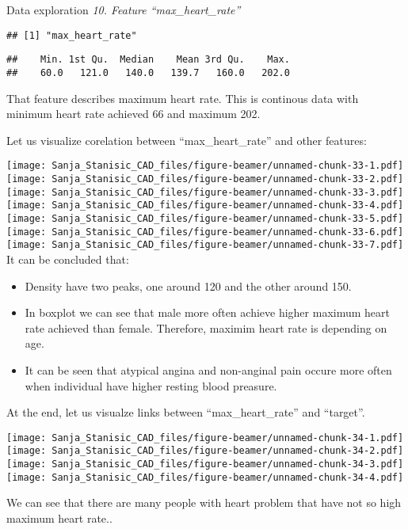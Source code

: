 \documentclass[
  ignorenonframetext,
]{beamer}
\begin{document}
\begin{frame}[fragile]{Data exploration}
\emph{10. Feature ``max\_heart\_rate''}

\begin{verbatim}
## [1] "max_heart_rate"
\end{verbatim}

\begin{verbatim}
##    Min. 1st Qu.  Median    Mean 3rd Qu.    Max. 
##    60.0   121.0   140.0   139.7   160.0   202.0
\end{verbatim}

That feature describes maximum heart rate. This is continous data with
minimum heart rate achieved 66 and maximum 202.

Let us visualize corelation between ``max\_heart\_rate'' and other
features:

\texttt{[image: Sanja\_Stanisic\_CAD\_files/figure-beamer/unnamed-chunk-33-1.pdf]}
\texttt{[image: Sanja\_Stanisic\_CAD\_files/figure-beamer/unnamed-chunk-33-2.pdf]}
\texttt{[image: Sanja\_Stanisic\_CAD\_files/figure-beamer/unnamed-chunk-33-3.pdf]}
\texttt{[image: Sanja\_Stanisic\_CAD\_files/figure-beamer/unnamed-chunk-33-4.pdf]}
\texttt{[image: Sanja\_Stanisic\_CAD\_files/figure-beamer/unnamed-chunk-33-5.pdf]}
\texttt{[image: Sanja\_Stanisic\_CAD\_files/figure-beamer/unnamed-chunk-33-6.pdf]}
\texttt{[image: Sanja\_Stanisic\_CAD\_files/figure-beamer/unnamed-chunk-33-7.pdf]}
It can be concluded that:

\begin{itemize}
\item
  Density have two peaks, one around 120 and the other around 150.
\item
  In boxplot we can see that male more often achieve higher maximum
  heart rate achieved than female. Therefore, maximim heart rate is
  depending on age.
\item
  It can be seen that atypical angina and non-anginal pain occure more
  often when individual have higher resting blood preasure.
\end{itemize}

At the end, let us visualze links between ``max\_heart\_rate'' and
``target''.

\texttt{[image: Sanja\_Stanisic\_CAD\_files/figure-beamer/unnamed-chunk-34-1.pdf]}
\texttt{[image: Sanja\_Stanisic\_CAD\_files/figure-beamer/unnamed-chunk-34-2.pdf]}
\texttt{[image: Sanja\_Stanisic\_CAD\_files/figure-beamer/unnamed-chunk-34-3.pdf]}
\texttt{[image: Sanja\_Stanisic\_CAD\_files/figure-beamer/unnamed-chunk-34-4.pdf]}

We can see that there are many people with heart problem that have not
so high maximum heart rate..


\end{frame}
\end{document}
